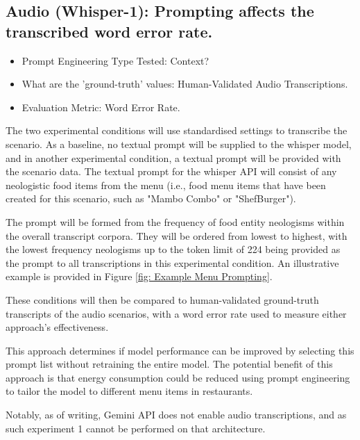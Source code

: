 
\subsection{Audio (Whisper-1): Prompting affects the transcribed word error rate.}

\begin{itemize}
    \item Prompt Engineering Type Tested: Context?
    \item What are the 'ground-truth' values: Human-Validated Audio Transcriptions.
    \item Evaluation Metric: Word Error Rate.
\end{itemize}

The two experimental conditions will use standardised settings to transcribe the scenario. As a baseline, no textual prompt will be supplied to the whisper model, and in another experimental condition, a textual prompt will be provided with the scenario data. The textual prompt for the whisper API will consist of any neologistic food items from the menu (i.e., food menu items that have been created for this scenario, such as "Mambo Combo" or "ShefBurger"). 

The prompt will be formed from the frequency of food entity neologisms within the overall transcript corpora. They will be ordered from lowest to highest, with the lowest frequency neologisms up to the token limit of 224 being provided as the prompt to all transcriptions in this experimental condition. An illustrative example is provided in Figure \ref{fig: Example Menu Prompting}.

These conditions will then be compared to human-validated ground-truth transcripts of the audio scenarios, with a word error rate used to measure either approach's effectiveness.

This approach determines if model performance can be improved by selecting this prompt list without retraining the entire model. The potential benefit of this approach is that energy consumption could be reduced using prompt engineering to tailor the model to different menu items in restaurants. 

Notably, as of writing, Gemini API does not enable audio transcriptions, and as such experiment 1 cannot be performed on that architecture.


